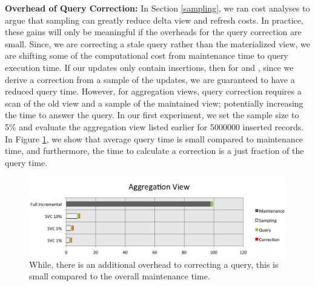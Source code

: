 {\noindent \bf Overhead of Query Correction: }
In Section \ref{sampling}, we ran cost analyses to argue that sampling can greatly reduce delta view and refresh costs.
In practice, these gains will only be meaningful if the overheads for the query correction are small.
Since, we are correcting a stale query rather than the materialized view, we are shifting some of the computational cost from maintenance time to query execution time.
If our updates only contain insertions, then for \spview and \fjview, since we derive a correction from a sample of the updates, we are guaranteed to have a reduced query time.
However, for aggregation views, query correction requires a scan of the old view and a sample of the maintained view; potentially increasing the time to 
answer the query. 
In our first experiment, we set the sample size to 5\% and evaluate the aggregation view listed earlier for 5000000 inserted records. 
In Figure \ref{exp10overheads}, we show that average query time is small compared to maintenance time, and furthermore, 
the time to calculate a correction is a just fraction of the query time.
\begin{figure}[h]
\centering
 \includegraphics[width=\columnwidth]{exp/total_time_agg_view.png}
 \caption{While, there is an additional overhead to correcting a query, this is small compared to the overall maintenance time. \label{exp10overheads}}
\end{figure}

